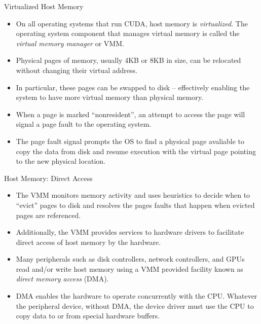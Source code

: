 \documentclass{beamer}
\begin{document}
\begin{frame}{Virtualized Host Memory}
\begin{itemize}
    \item<1->On all operating systems that run CUDA, host memory is \emph{virtualized}.  The operating system component that manages virtual memory is called the \emph{virtual memory manager} or VMM.
    \item<1->Physical pages of memory, usually 4KB or 8KB in size, can be relocated without changing their virtual address.
    \item<1->In particular, these pages can be swapped to disk -- effectively enabling the system to have more virtual memory than physical memory.
    \item<1->When a page is marked ``nonresident'', an attempt to access the page will signal a page fault to the operating system.
    \item<1->The page fault signal prompts the OS to find a physical page avaliable to copy the data from disk and resume execution with the virtual page pointing to the new physical location.
\end{itemize}
\end{frame}

\begin{frame}{Host Memory: Direct Access}
\begin{itemize}
\itemsep1em
    \item<1->The VMM monitors memory activity and uses heuristics to decide when to ``evict'' pages to disk and resolves the pages faults that happen when evicted pages are referenced.
    \item<1->Additionally, the VMM provides services to hardware drivers to facilitate direct access of host memory by the hardware.
    \item<1->Many peripherals such as disk controllers, network controllers, and GPUs  read and/or write host memory using a VMM provided facility known as \emph{direct memory access} (DMA).
    \item<1->DMA enables the hardware to operate concurrently with the CPU.  Whatever the peripheral device, without DMA, the device driver must use the CPU to copy data to or from special hardware buffers.
\end{itemize}
\end{frame}
\end{document}
